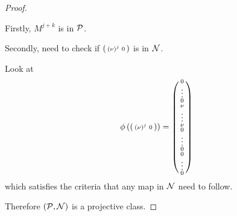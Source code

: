 \begin{proof}
\begin{enumerate}
{            Firstly, \( M^{j + k} \) is in \( {\mathcal{P}} \).

            Secondly, need to check if \( 
                \begin{psmallmatrix}
                    \left( \nu \right)^j & 0
                \end{psmallmatrix}
            \) is in \( {\mathcal{N}} \).

            Look at
            \[
                \phi\left( 
                    \begin{psmallmatrix}
                        \left( \nu \right)^j & 0
                    \end{psmallmatrix}
                 \right)
                =
                \begin{psmallmatrix}
                    0 \\
                    \vdots \\
                    0 \\
                    \nu \\
                    \vdots \\
                    \nu \\
                    0 \\
                    \vdots \\
                    0 \\
                    0 \\
                    \vdots \\
                    0
                \end{psmallmatrix}
            \]
            which satisfies the criteria that any map in \( {\mathcal{N}} \) need to follow.
        }
    \end{enumerate}
    
    Therefore \( \left( {\mathcal{P}}, {\mathcal{N}} \right) \) is a projective class.
\end{proof}